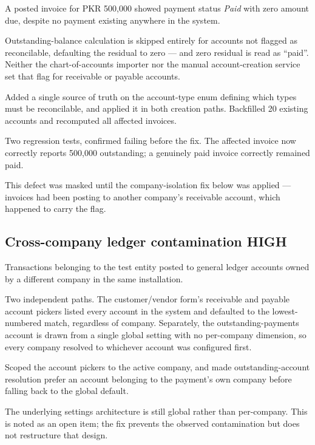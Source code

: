 \documentclass[11pt,a4paper]{article}
\newcommand{\sev}[2]{\textcolor{#1}{\small\textsf{\textbf{#2}}}}
\begin{document}
\begin{description}[leftmargin=!, labelwidth=2.4cm, font=\small\sffamily\bfseries\color{muted}]
  \item[Symptom] A posted invoice for PKR 500,000 showed payment status \emph{Paid} with zero amount
    due, despite no payment existing anywhere in the system.
  \item[Root cause] Outstanding-balance calculation is skipped entirely for accounts not flagged as
    reconcilable, defaulting the residual to zero --- and zero residual is read as ``paid''. Neither the
    chart-of-accounts importer nor the manual account-creation service set that flag for receivable or
    payable accounts.
  \item[Fix] Added a single source of truth on the account-type enum defining which types must be
    reconcilable, and applied it in both creation paths. Backfilled 20 existing accounts and recomputed
    all affected invoices.
  \item[Verification] Two regression tests, confirmed failing before the fix. The affected invoice now
    correctly reports 500,000 outstanding; a genuinely paid invoice correctly remained paid.
  \item[Note] This defect was masked until the company-isolation fix below was applied --- invoices had
    been posting to another company's receivable account, which happened to carry the flag.
\end{description}

\subsection[Cross-company ledger contamination]{Cross-company ledger contamination \hfill \sev{high}{HIGH}}

\begin{description}[leftmargin=!, labelwidth=2.4cm, font=\small\sffamily\bfseries\color{muted}]
  \item[Symptom] Transactions belonging to the test entity posted to general ledger accounts owned by
    a different company in the same installation.
  \item[Root cause] Two independent paths. The customer/vendor form's receivable and payable account
    pickers listed every account in the system and defaulted to the lowest-numbered match, regardless of
    company. Separately, the outstanding-payments account is drawn from a single global setting with no
    per-company dimension, so every company resolved to whichever account was configured first.
  \item[Fix] Scoped the account pickers to the active company, and made outstanding-account resolution
    prefer an account belonging to the payment's own company before falling back to the global default.
  \item[Residual risk] The underlying settings architecture is still global rather than per-company.
    This is noted as an open item; the fix prevents the observed contamination but does not restructure
    that design.
\end{description}
\end{document}
